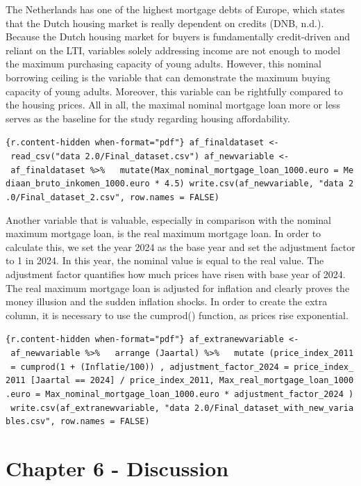 \documentclass[
]{article}
\begin{document}
{The Netherlands has one of the highest mortgage debts of Europe, which
states that the Dutch housing market is really dependent on credits
(DNB, n.d.). Because the Dutch housing market for buyers is
fundamentally credit-driven and reliant on the LTI, variables solely
addressing income are not enough to model the maximum purchasing
capacity of young adults. However, this nominal borrowing ceiling is the
variable that can demonstrate the maximum buying capacity of young
adults. Moreover, this variable can be rightfully compared to the
housing prices. All in all, the maximal nominal mortgage loan more or
less serves as the baseline for the study regarding housing
affordability.

\texttt{\{r.content-hidden\ when-format="pdf"\}\ af\_finaldataset\ \textless{}-\ read\_csv("data\ 2.0/Final\_dataset.csv")\ af\_newvariable\ \textless{}-\ af\_finaldataset\ \%\textgreater{}\%\ \ \ mutate(Max\_nominal\_mortgage\_loan\_1000.euro\ =\ Mediaan\_bruto\_inkomen\_1000.euro\ *\ 4.5)\ write.csv(af\_newvariable,\ "data\ 2.0/Final\_dataset\_2.csv",\ row.names\ =\ FALSE)}

Another variable that is valuable, especially in comparison with the
nominal maximum mortgage loan, is the real maximum mortgage loan. In
order to calculate this, we set the year 2024 as the base year and set
the adjustment factor to 1 in 2024. In this year, the nominal value is
equal to the real value. The adjustment factor quantifies how much
prices have risen with base year of 2024. The real maximum mortgage loan
is adjusted for inflation and clearly proves the money illusion and the
sudden inflation shocks. In order to create the extra column, it is
necessary to use the cumprod() function, as prices rise exponential.

\texttt{\{r.content-hidden\ when-format="pdf"\}\ af\_extranewvariable\ \textless{}-\ af\_newvariable\ \%\textgreater{}\%\ \ \ arrange\ (Jaartal)\ \%\textgreater{}\%\ \ \ mutate\ (price\_index\_2011\ =\ cumprod(1\ +\ (Inflatie/100))\ ,\ adjustment\_factor\_2024\ =\ price\_index\_2011\ {[}Jaartal\ ==\ 2024{]}\ /\ price\_index\_2011,\ Max\_real\_mortgage\_loan\_1000.euro\ =\ Max\_nominal\_mortgage\_loan\_1000.euro\ *\ adjustment\_factor\_2024\ )\ write.csv(af\_extranewvariable,\ "data\ 2.0/Final\_dataset\_with\_new\_variables.csv",\ row.names\ =\ FALSE)}

\section{Chapter 6 - Discussion}\label{chapter-6---discussion}

}
\end{document}

